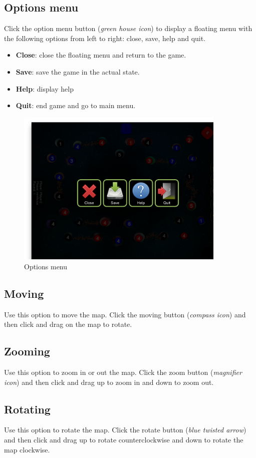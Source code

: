\documentclass[12pt,a4paper]{article}
\begin{document}
\subsection{Options menu}
Click the option menu button ({\it green house icon}) to display a floating menu with the following options from left to right: close, save, help and quit.

\begin{itemize}
\item {\bf Close}: close the floating menu and return to the game.
\item {\bf Save}: save the game in the actual state.
\item {\bf Help}: display help
\item {\bf Quit}: end game and go to main menu.
\end{itemize}

\begin{figure}[h!]
\centering
\includegraphics[width=10cm]{pic/screenshot14.png}
\caption{Options menu}
\label{fig:optionmenu}
\end{figure}


\subsection{Moving}
Use this option to move the map. Click the moving button ({\it compass icon}) and then click and drag on the map to rotate.

\subsection{Zooming}
Use this option to zoom in or out the map. Click the zoom button ({\it magnifier icon}) and then click and drag up to zoom in and down to zoom out.

\subsection{Rotating}
Use this option to rotate the map. Click the rotate button ({\it blue twisted arrow}) and then click and drag up to rotate counterclockwise and down to rotate the map clockwise.
\end{document}
